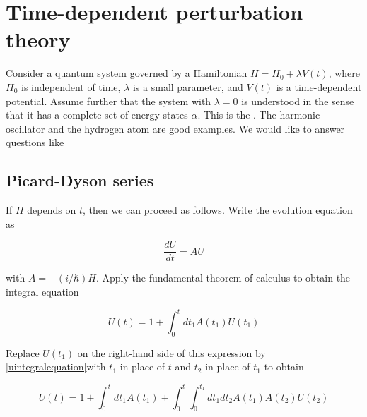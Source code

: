 
\begin{mathmacro}
\newcommand{\bra}[0]{\langle}
\newcommand{\ket}[0]{\rangle}
\newcommand{\caF}[0]{\mathcal{F}}
\newcommand{\caA}[0]{\mathcal{A}}
\newcommand{\boR}[0]{\bf{R}}
\newcommand{\sett}[2]{\{#1\ |\ #2 \}}
\newcommand{\set}[1]{\{#1\}}
\end{mathmacro}

\setcounter{section}{11}


\section{Time-dependent perturbation theory}

\innertableofcontents

Consider a quantum system governed by a Hamiltonian $H = H_0 + \lambda V(t)$, where $H_0$ is independent of time, $\lambda$ is a small parameter, and $V(t)$ is a time-dependent potential.  Assume further that the system with $\lambda = 0$ is understood in the sense that it has a complete set of energy states $\alpha$.  This is the . The harmonic oscillator and the hydrogen atom are good examples.  We would like to answer questions like 

\subsection{Picard-Dyson series}

If $H$ depends on $t$, then we can proceed as follows.
Write the  evolution equation as

\begin{equation}
\frac{dU}{dt} =AU
\end{equation}

with $A = -(i/\hbar)H$.  Apply the  fundamental theorem of calculus to obtain the integral equation

\begin{equation}
\label{uintegralequation}
U(t) = 1 + \int_0^t dt_1 A(t_1)U(t_1)
\end{equation}

Replace $U(t_1)$ on the right-hand side of this expression by \eqref{uintegralequation}with $t_1$ in place of $t$ and $t_2$ in place of $t_1$ to obtain

\begin{equation}
U(t) = 1 + \int_0^t dt_1 A(t_1)
+ \int_0^t  \int_0^{t_1}   dt_1dt_2 A(t_1) A(t_2)U(t_2)
\end{equation}


